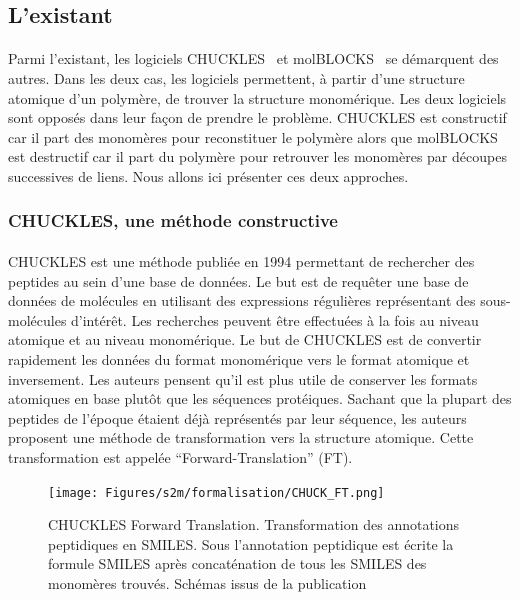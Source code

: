 \documentclass[12pt,french,twoside]{report}
\begin{document}
\subsection{L'existant}

\paragraph{}Parmi l'existant, les logiciels CHUCKLES~\cite{siani_chuckles:_1994} et molBLOCKS~\cite{ghersi_molblocks:_2014} se démarquent des autres.
Dans les deux cas, les logiciels permettent, à partir d'une structure atomique d'un polymère, de trouver la structure monomérique.
Les deux logiciels sont opposés dans leur façon de prendre le problème.
CHUCKLES est constructif car il part des monomères pour reconstituer le polymère alors que molBLOCKS est destructif car il part du polymère pour retrouver les monomères par découpes successives de liens.
Nous allons ici présenter ces deux approches.


\subsubsection{CHUCKLES, une méthode constructive}

\paragraph{}CHUCKLES est une méthode publiée en 1994 permettant de rechercher des peptides au sein d'une base de données.
Le but est de requêter une base de données de molécules en utilisant des expressions régulières représentant des sous-molécules d'intérêt.
Les recherches peuvent être effectuées à la fois au niveau atomique et au niveau monomérique.
Le but de CHUCKLES est de convertir rapidement les données du format monomérique vers le format atomique et inversement.
Les auteurs pensent qu'il est plus utile de conserver les formats atomiques en base plutôt que les séquences protéiques.
Sachant que la plupart des peptides de l'époque étaient déjà représentés par leur séquence, les auteurs proposent une méthode de transformation vers la structure atomique.
Cette transformation est appelée ``Forward-Translation'' (FT).

\begin{figure}[!h]
  \begin{center}
    \texttt{[image: Figures/s2m/formalisation/CHUCK\_FT.png]}
    \caption{\label{chuck_ft}CHUCKLES Forward Translation.
    Transformation des annotations peptidiques en SMILES.
    Sous l'annotation peptidique est écrite la formule SMILES après concaténation de tous les SMILES des monomères trouvés.
    Schémas issus de la publication}
  \end{center}
\end{figure}
\end{document}

